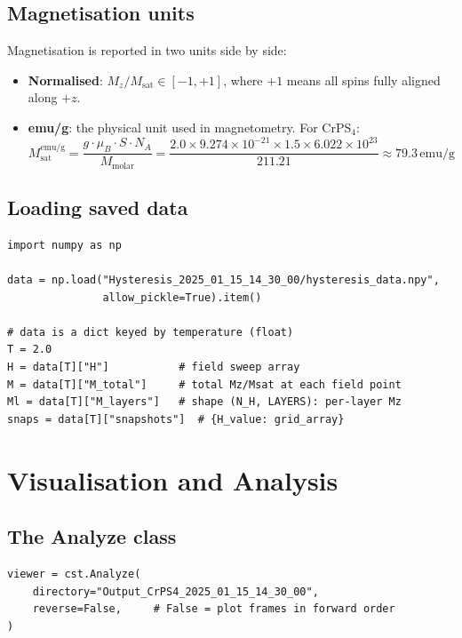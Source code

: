 \documentclass[12pt,a4paper]{article}
\begin{document}
\subsection{Magnetisation units}

Magnetisation is reported in two units side by side:

\begin{itemize}
  \item \textbf{Normalised}: $M_z / M_\text{sat} \in [-1, +1]$, where $+1$
        means all spins fully aligned along $+z$.
  \item \textbf{emu/g}: the physical unit used in magnetometry. For CrPS$_4$:
        \[
          M_\text{sat}^{\text{emu/g}} = \frac{g \cdot \mu_B \cdot S \cdot N_A}{M_\text{molar}}
          = \frac{2.0 \times 9.274\times10^{-21} \times 1.5 \times 6.022\times10^{23}}{211.21}
          \approx 79.3\,\text{emu/g}
        \]
\end{itemize}

\subsection{Loading saved data}

\begin{lstlisting}[style=python]
import numpy as np

data = np.load("Hysteresis_2025_01_15_14_30_00/hysteresis_data.npy",
               allow_pickle=True).item()

# data is a dict keyed by temperature (float)
T = 2.0
H = data[T]["H"]           # field sweep array
M = data[T]["M_total"]     # total Mz/Msat at each field point
Ml = data[T]["M_layers"]   # shape (N_H, LAYERS): per-layer Mz
snaps = data[T]["snapshots"]  # {H_value: grid_array}
\end{lstlisting}

\section{Visualisation and Analysis}
\label{sec:viz}

\subsection{The Analyze class}

\begin{lstlisting}[style=python]
viewer = cst.Analyze(
    directory="Output_CrPS4_2025_01_15_14_30_00",
    reverse=False,     # False = plot frames in forward order
)
\end{lstlisting}
\end{document}

